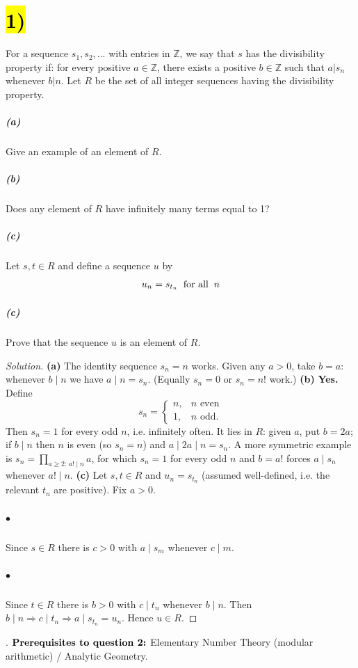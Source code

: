 \documentclass[11pt]{article}
\newenvironment{solution}
  {\renewcommand\qedsymbol{$\blacksquare$}\begin{proof}[Solution]}
  {\end{proof}}
\begin{document}
\section*{\hl{1)}} For a sequence $s_1,s_2, ...$ with entries in $\mathds{Z}$, we say that $s$ has the divisibility property if:
for every positive $a \in \mathds{Z}$, there exists a positive $b \in \mathds{Z}$ such that $a|s_n$ whenever $b|n$. Let $R$ be the set of all integer sequences having the divisibility property.
\subparagraph*{(a)} Give an example of an element of $R$.\vspace*{-\baselineskip}
\subparagraph*{(b)} Does any element of $R$ have infinitely many terms equal to 1?\vspace*{-\baselineskip}
\subparagraph*{(c)}  Let $s,t \in R$ and define a sequence $u$ by
$$u_n = s_{t_n} \hspace{2mm}\text{for all}\hspace{2mm} n$$
\subparagraph*{\color{white} (c)}Prove that the sequence $u$ is an element of $R$.
\begin{solution}
\textbf{(a)} The identity sequence $s_n = n$ works. Given any $a>0$, take $b=a$: whenever $b\mid n$ we have $a\mid n = s_n$. (Equally $s_n=0$ or $s_n=n!$ work.)
\newline
\textbf{(b)} \textbf{Yes.} Define
$$s_n = \begin{cases} n, & n \text{ even}\\ 1, & n \text{ odd}.\end{cases}$$
Then $s_n=1$ for every odd $n$, i.e. infinitely often. It lies in $R$: given $a$, put $b=2a$; if $b\mid n$ then $n$ is even (so $s_n=n$) and $a\mid 2a\mid n=s_n$.
\newline
A more symmetric example is $s_n=\prod_{a\ge2:\,a!\mid n}a$, for which $s_n=1$ for every odd $n$ and $b=a!$ forces $a\mid s_n$ whenever $a!\mid n$.
\newline
\textbf{(c)} Let $s,t\in R$ and $u_n=s_{t_n}$ (assumed well-defined, i.e. the relevant $t_n$ are positive). Fix $a>0$.
\subparagraph*{$\bullet$} Since $s\in R$ there is $c>0$ with $a\mid s_m$ whenever $c\mid m$.
\subparagraph*{$\bullet$} Since $t\in R$ there is $b>0$ with $c\mid t_n$ whenever $b\mid n$.
\newline
Then $b\mid n\Rightarrow c\mid t_n\Rightarrow a\mid s_{t_n}=u_n$. Hence $u\in R$. 
\end{solution}


{\color{white}.}\newline
$\text{\bf {Prerequisites to question 2:}}$ Elementary Number Theory (modular arithmetic) / Analytic Geometry.
\end{document}
